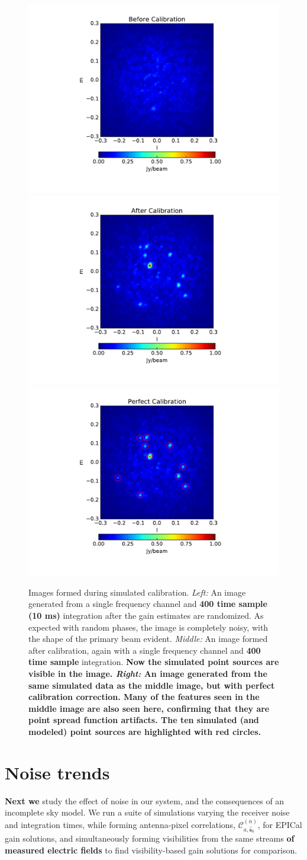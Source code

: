 \documentclass[a4paper,fleqn,usenatbib]{../mnras}
\newcommand{\spix}{\ensuremath{\hat{\mathbf{s}}_{0}}}
\newcommand{\Cna}[1][n]{\ensuremath{\mathcal{C}^{(#1)}_{a,\spix}}}
\begin{document}
\begin{figure}
\begin{center}
\includegraphics[width=.3\linewidth]{fig5a.pdf}
\includegraphics[width=.3\linewidth]{fig5b.pdf}
\includegraphics[width=.3\linewidth]{fig5c.pdf}
\caption{Images formed during simulated calibration. \emph{Left:} An image generated from a 
single frequency channel and \textbf{400 time sample (10 ms)} integration after the gain estimates are randomized. As 
expected with random phases, the image is completely noisy, with the shape of the primary 
beam evident. \emph{Middle:} An image formed after calibration, again with a single frequency 
channel and \textbf{400 time sample} integration. \textbf{Now the simulated point sources are visible in the image. 
\emph{Right:} An image generated from the same simulated data as the middle image, but 
with perfect calibration correction. Many of the features seen in the middle image are also
seen here, confirming that they are point spread function artifacts. The ten simulated (and modeled) point sources are highlighted with red circles.}
\label{fig:sim_images}
}
\end{center}
\end{figure}

\section{Noise trends}\label{sec:noise}
\textbf{Next we} study the effect of noise in our system, and the consequences 
of an incomplete sky model. We run a suite of simulations varying the receiver noise and 
integration times, while forming antenna-pixel correlations, $\Cna$, for EPICal gain solutions, 
and simultaneously forming visibilities from the same streams \textbf{of measured electric fields} to find visibility-based 
gain solutions for comparison. 
\end{document}
